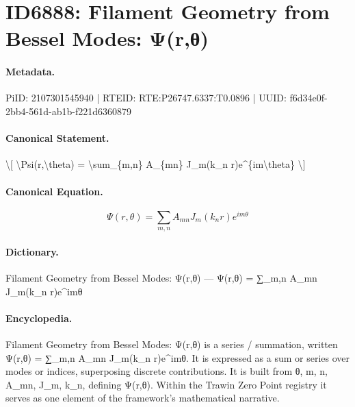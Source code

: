 \section*{ID6888: Filament Geometry from Bessel Modes: Ψ(r,θ)}
\paragraph{Metadata.}
PiID: 2107301545940 | RTEID: RTE:P26747.6337:T0.0896 | UUID: f6d34e0f-2bb4-561d-ab1b-f221d6360879

\paragraph{Canonical Statement.}
\textbackslash{}[ \textbackslash{}Psi(r,\textbackslash{}theta) = \textbackslash{}sum\_\{m,n\} A\_\{mn\} J\_m(k\_n r)e\textasciicircum{}\{im\textbackslash{}theta\} \textbackslash{}]

\paragraph{Canonical Equation.}
\[
\Psi(r,\theta) = \sum_{m,n} A_{mn} J_m(k_n r)e^{im\theta}
\]

\paragraph{Dictionary.}
Filament Geometry from Bessel Modes: Ψ(r,θ) — Ψ(r,θ) = ∑\_m,n A\_mn J\_m(k\_n r)e\textasciicircum{}imθ

\paragraph{Encyclopedia.}
Filament Geometry from Bessel Modes: Ψ(r,θ) is a series / summation, written Ψ(r,θ) = ∑\_m,n A\_mn J\_m(k\_n r)e\textasciicircum{}imθ. It is expressed as a sum or series over modes or indices, superposing discrete contributions. It is built from θ, m, n, A\_mn, J\_m, k\_n, defining Ψ(r,θ). Within the Trawin Zero Point registry it serves as one element of the framework's mathematical narrative.
